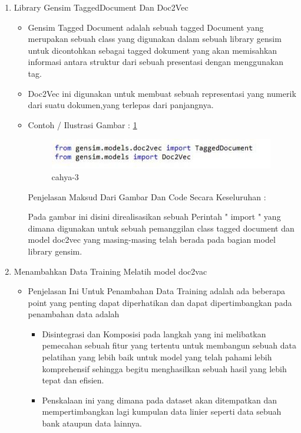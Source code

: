 \begin{enumerate}
\par
\par
\par
\item Library Gensim TaggedDocument Dan Doc2Vec
\begin{itemize}
\item Gensim Tagged Document adalah sebuah tagged Document yang merupakan sebuah class yang digunakan dalam sebuah library gensim untuk dicontohkan sebagai tagged dokument yang akan memisahkan informasi antara struktur dari sebuah presentasi dengan menggunakan tag.
\item Doc2Vec ini digunakan untuk membuat sebuah representasi yang numerik dari suatu dokumen,yang terlepas dari panjangnya. 
\item Contoh / Ilustrasi Gambar : \ref{cahya-3}
\par
\begin{figure}[!hbtp]
\centering
\includegraphics[scale=0.3]{figures/cahya-3.jpg}
\caption{cahya-3}
\label{cahya-3}
\end{figure}
\par
\par Penjelasan  Maksud Dari Gambar Dan Code Secara Keseluruhan  : 
\par Pada gambar ini disini direalisasikan sebuah Perintah " import " yang dimana digunakan untuk sebuah pemanggilan class tagged document dan model doc2vec yang masing-masing telah  berada pada bagian model library gensim.
\par
\end{itemize}
\item Menambahkan Data Training  Melatih model doc2vac 
\begin{itemize}
\item Penjelasan Ini Untuk Penambahan Data Training adalah  ada beberapa point yang  penting dapat diperhatikan dan dapat dipertimbangkan pada penambahan data adalah
\begin{itemize}
\item Disintegrasi dan Komposisi pada  langkah yang ini melibatkan pemecahan sebuah fitur yang tertentu untuk membangun sebuah data pelatihan yang lebih baik untuk model yang telah pahami lebih komprehensif sehingga begitu menghasilkan sebuah hasil yang lebih tepat dan efisien.
\item Penskalaan ini yang dimana pada dataset akan ditempatkan dan mempertimbangkan lagi kumpulan data linier seperti data sebuah bank ataupun data lainnya.

\end{itemize}
\end{itemize}
\end{enumerate}
